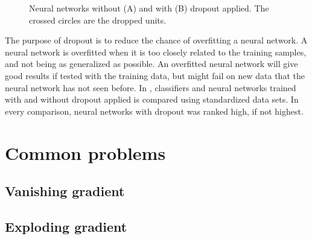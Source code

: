 \begin{figure}[H]
\begin{subfigure}{1\textwidth}
    \caption{}
    \label{fig:net_with_dropout}
    \end{subfigure}
\caption{Neural networks without (A) and with (B) dropout applied. The crossed circles are the dropped units.}
\label{fig:dropout_comparison}
\end{figure}

The purpose of dropout is to reduce the chance of overfitting a neural network. A neural network is overfitted when it is too closely related to the training samples, and not being as generalized as possible. An overfitted neural network will give good results if tested with the training data, but might fail on new data that the neural network has not seen before. In \cite{srivastava_dropout:_2014}, classifiers and neural networks trained with and without dropout applied is compared using standardized data sets. In every comparison, neural networks with dropout was ranked high, if not highest.



\section{Common problems}

\subsection{Vanishing gradient}
\label{vanishing-gradient}
\subsection{Exploding gradient}

